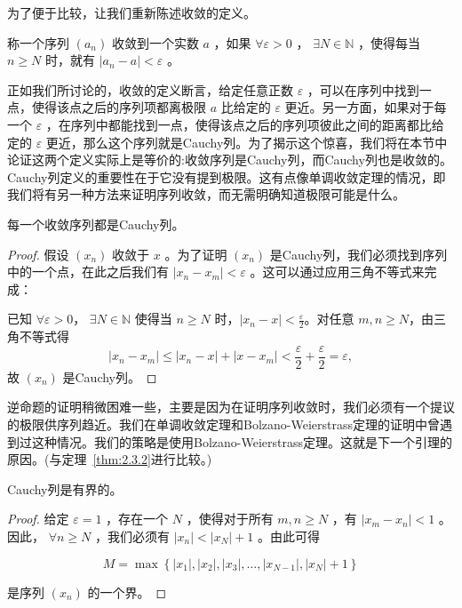 为了便于比较，让我们重新陈述收敛的定义。

\begingroup
\renewcommand{\theThm}{} %
\begin{Def}[序列的收敛性]
称一个序列 \(\left( {a}_{n}\right)\) 收敛到一个实数 \(a\) ，如果 \(\forall \varepsilon  > 0\) ， \(\exists N \in  \mathbb{N}\) ，使得每当 \(n \geq  N\) 时，就有 \(\left| {{a}_{n} - a}\right|  < \varepsilon\) 。
\end{Def}
\endgroup

\addtocounter{Thm}{-1}

正如我们所讨论的，收敛的定义断言，给定任意正数 \(\varepsilon\) ，可以在序列中找到一点，使得该点之后的序列项都离极限 \(a\) 比给定的 \(\varepsilon\) 更近。另一方面，如果对于每一个 \(\varepsilon\) ，在序列中都能找到一点，使得该点之后的序列项彼此之间的距离都比给定的 \(\varepsilon\) 更近，那么这个序列就是Cauchy列。为了揭示这个惊喜，我们将在本节中论证这两个定义实际上是等价的:收敛序列是Cauchy列，而Cauchy列也是收敛的。Cauchy列定义的重要性在于它没有提到极限。这有点像单调收敛定理的情况，即我们将有另一种方法来证明序列收敛，而无需明确知道极限可能是什么。

\begin{Thm}
  \label{thm:2.6.2}
  每一个收敛序列都是Cauchy列。
\end{Thm}

\begin{proof}
  假设 \(\left( {x}_{n}\right)\) 收敛于 \(x\) 。为了证明 \(\left( {x}_{n}\right)\) 是Cauchy列，我们必须找到序列中的一个点，在此之后我们有 \(\left| {{x}_{n} - {x}_{m}}\right|  < \varepsilon\) 。这可以通过应用三角不等式来完成：

已知 \(\forall \varepsilon > 0\)， \(\exists N\in \mathbb{N}\) 使得当 \(n \geq N\) 时，\(|x_{n} - x| < \frac{\varepsilon}{2}\)。对任意 \(m, n \geq N\)，由三角不等式得  
  \[
  |x_{n} - x_{m}| \leq |x_{n} - x| + |x - x_{m}| < \frac{\varepsilon}{2} + \frac{\varepsilon}{2} = \varepsilon,
  \]
  故 \(\left( x_{n} \right)\) 是Cauchy列。
\end{proof}


逆命题的证明稍微困难一些，主要是因为在证明序列收敛时，我们必须有一个提议的极限供序列趋近。我们在单调收敛定理和Bolzano-Weierstrass定理的证明中曾遇到过这种情况。我们的策略是使用Bolzano-Weierstrass定理。这就是下一个引理的原因。(与定理~\ref{thm:2.3.2}进行比较。)

\begin{Lem}
  \label{lem:2.6.3}
  Cauchy列是有界的。
\end{Lem}

\begin{proof}
给定 \(\varepsilon  = 1\) ，存在一个 \(N\) ，使得对于所有 \(m,n \geq  N\) ，有 \(\left| {{x}_{m} - {x}_{n}}\right|  < 1\) 。因此， \(\forall n \geq  N\) ，我们必须有 \(\left| {x}_{n}\right|  < \left| {x}_{N}\right|  + 1\) 。由此可得

\[
M = \max \left\{  {\left| {x}_{1}\right| ,\left| {x}_{2}\right| ,\left| {x}_{3}\right| ,\ldots ,\left| {x}_{N - 1}\right| ,\left| {x}_{N}\right|  + 1}\right\}
\]

是序列 \(\left( {x}_{n}\right)\) 的一个界。  
\end{proof}



